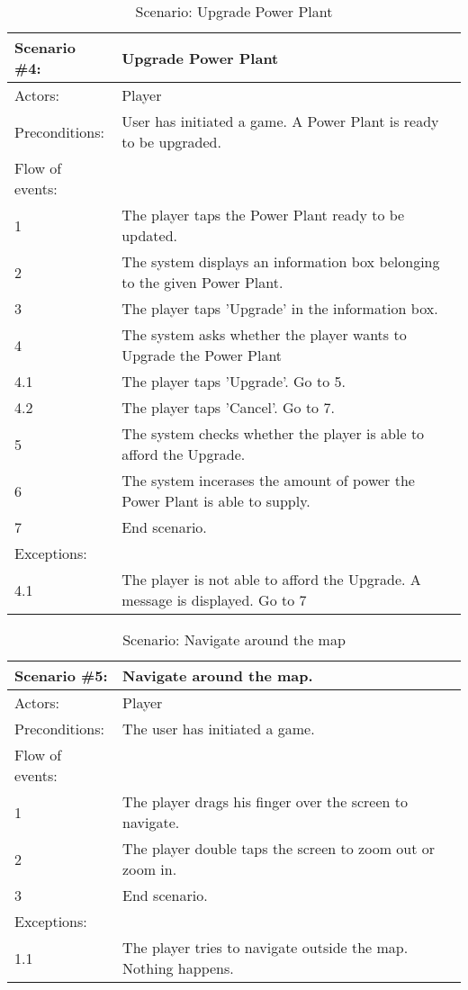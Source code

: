 \begin{table}
	\begin{tabular}{| l | p{10cm} |}
		\hline
		\rowcolor{lightgray}
		{\bf Scenario \#4:} & {\bf Upgrade Power Plant} \\ \hline
		Actors: & Player \\ \hline
		Preconditions: & User has initiated a game. A Power Plant is ready to be upgraded. \\ \hline
		Flow of events: & \\ \hline
		1 & The player taps the Power Plant ready to be updated. \\ \hline
		2 & The system displays an information box belonging to the given Power Plant. \\ \hline
		3 & The player taps 'Upgrade' in the information box. \\ \hline
		4 & The system asks whether the player wants to Upgrade the Power Plant \\ \hline
		4.1 & The player taps 'Upgrade'. Go to 5. \\ \hline
		4.2 & The player taps 'Cancel'. Go to 7. \\ \hline
		5 & The system checks whether the player is able to afford the Upgrade. \\ \hline
		6 & The system incerases the amount of power the Power Plant is able to supply. \\ \hline
		7 & End scenario. \\ \hline
		Exceptions: & \\ \hline
		4.1 & The player is not able to afford the Upgrade. A message is displayed. Go to 7 \\ \hline 
	\end{tabular}
\caption{Scenario: Upgrade Power Plant}
\end{table}

\begin{table}
	\begin{tabular}{| l | p{10cm} |}
		\hline
		\rowcolor{lightgray}
		{\bf Scenario \#5:} & {\bf Navigate around the map.} \\ \hline
		Actors: & Player \\ \hline
		Preconditions: & The user has initiated a game. \\ \hline
		Flow of events: & \\ \hline
		1 & The player drags his finger over the screen to navigate. \\ \hline
		2 & The player double taps the screen to zoom out or zoom in. \\ \hline
		3 & End scenario. \\ \hline
		Exceptions: & \\ \hline
		1.1 & The player tries to navigate outside the map. Nothing happens. \\ \hline
	\end{tabular}
	\caption{Scenario: Navigate around the map}
\end{table}

